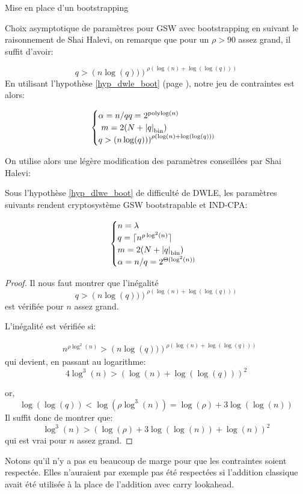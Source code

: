 \begin{section}{Mise en place d'un bootstrapping}
\begin{subsection}{Choix asymptotique de paramètres pour GSW avec bootstrapping}
en suivant le raisonnement de Shai Halevi, on remarque 
que pour un $\rho > 90$ assez grand, il suffit d'avoir:

\begin{equation}
q > {\left(n\log(q))\right)}^{\rho \left(\log(n) + \log(\log(q))\right)}
\end{equation}
En utilisant l'hypothèse  \ref{hyp_dwle_boot} (page \pageref{hyp_dwle_boot}), notre jeu de contraintes est alors:

\[ \begin{cases}
\alpha  = n /q
	q = 2^\text{polylog$(n)$}\\ 
	m = 2(N + \bnorm{q}) \\  
	q > {\left(n\log(q))\right)}^{\rho \left(\log(n) + \log(\log(q))\right)}
	\end{cases} \]

On utilise alors une légère modification des paramètres conseillées par Shai Halevi:
\begin{thm}
Sous l'hypothèse \ref{hyp_dlwe_boot} de difficulté de DWLE, les paramètres suivants rendent cryptosystème GSW bootstrapable et IND-CPA:

\[ \begin{cases}
 	n = \lambda \\
	q = \lceil n^{\rho \log^2(n)}\rceil \\
	m = 2(N + \bnorm{q}) \\  
	\alpha = n/q = 2^{\Theta(\log^2(n))}
	\end{cases} \]
\end{thm}
\begin{proof}
Il nous faut montrer que l'inégalité 
	\[ q > {\left(n\log(q))\right)}^{\rho \left(\log(n) +
	\log(\log(q))\right)} \]
est vérifiée pour $n$ assez grand.

L'inégalité est vérifiée si:

	\begin{align*} &n^{\rho \log^2(n)} > {\left(n\log(q))\right)}^{\rho \left(\log(n) +
	\log(\log(q))\right)}\end{align*}
qui devient, en passant au logarithme:
\[ 4 \log^3(n) > {(\log(n) + \log(\log(q)))}^2 \]

or,
\[ \log(\log(q)) < \log(\rho \log^3(n)) = \log(\rho) + 3 \log(\log(n)) \]
Il suffit donc de montrer que:
\[ \log^3(n) > {(\log(\rho) + 3\log(\log(n)) + \log(n))}^2 \]
qui est vrai pour $n$ assez grand.
\end{proof}
\begin{rmq}
Notons qu'il n'y a pas eu beaucoup de marge pour que les contraintes soient
respectée. Elles n'auraient par exemple pas été respectées si l'addition 
classique avait été utilisée à la place de l'addition avec carry lookahead.
\end{rmq}


\end{subsection}



\end{section}

